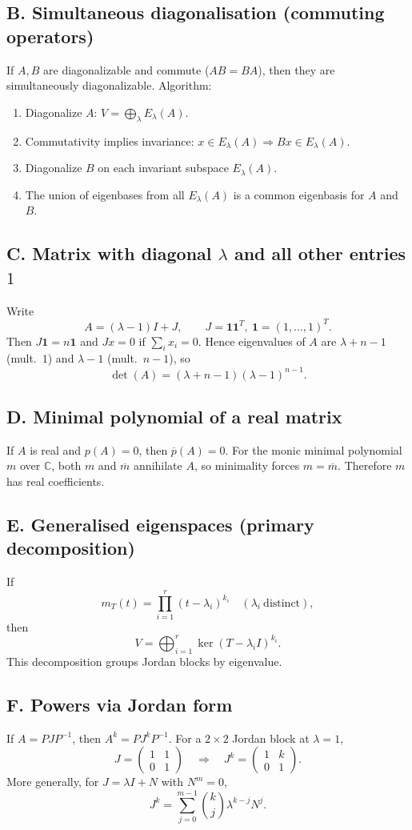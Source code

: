 \documentclass[12pt,a4paper]{article}
\theoremstyle{plain}
\theoremstyle{definition}      %
\begin{document}
\subsection*{B. Simultaneous diagonalisation (commuting operators)}
If $A,B$ are diagonalizable and commute ($AB=BA$), then they are simultaneously diagonalizable.
Algorithm:
\begin{enumerate}
	\item Diagonalize $A$: $V=\bigoplus_{\lambda}E_\lambda(A)$.
	\item Commutativity implies invariance: $x\in E_\lambda(A)\Rightarrow Bx\in E_\lambda(A)$.
	\item Diagonalize $B$ on each invariant subspace $E_\lambda(A)$.
	\item The union of eigenbases from all $E_\lambda(A)$ is a common eigenbasis for $A$ and $B$.
\end{enumerate}

\subsection*{C. Matrix with diagonal $\lambda$ and all other entries $1$}
Write
\[
A=(\lambda-1)I+J,\qquad J=\mathbf 1\mathbf 1^T,\ \mathbf 1=(1,\dots,1)^T.
\]
Then $J\mathbf 1=n\mathbf 1$ and $Jx=0$ if $\sum_i x_i=0$.
Hence eigenvalues of $A$ are $\lambda+n-1$ (mult.\ $1$) and $\lambda-1$ (mult.\ $n-1$), so
\[
\det(A)=(\lambda+n-1)(\lambda-1)^{n-1}.
\]

\subsection*{D. Minimal polynomial of a real matrix}
If $A$ is real and $p(A)=0$, then $\overline{p}(A)=0$.
For the monic minimal polynomial $m$ over $\mathbb C$, both $m$ and $\overline m$ annihilate $A$,
so minimality forces $m=\overline m$. Therefore $m$ has real coefficients.

\subsection*{E. Generalised eigenspaces (primary decomposition)}
If
\[
m_T(t)=\prod_{i=1}^r (t-\lambda_i)^{k_i}\quad(\lambda_i\ \text{distinct}),
\]
then
\[
V=\bigoplus_{i=1}^r \ker(T-\lambda_i I)^{k_i}.
\]
This decomposition groups Jordan blocks by eigenvalue.

\subsection*{F. Powers via Jordan form}
If $A=PJP^{-1}$, then $A^k=PJ^kP^{-1}$.
For a $2\times 2$ Jordan block at $\lambda=1$,
\[
J=\begin{pmatrix}1&1\\0&1\end{pmatrix}
\quad\Rightarrow\quad
J^k=\begin{pmatrix}1&k\\0&1\end{pmatrix}.
\]
More generally, for $J=\lambda I+N$ with $N^m=0$,
\[
J^k=\sum_{j=0}^{m-1}\binom{k}{j}\lambda^{k-j}N^j.
\]
\end{document}
